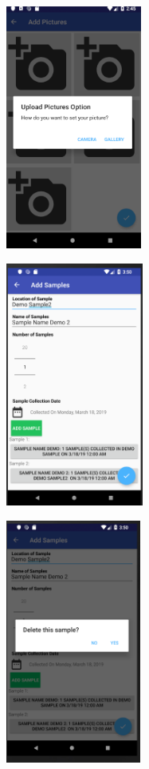 \documentclass[onecolumn, draftclsnofoot,10pt, compsoc]{IEEEtran}
\begin{document}
\begin{center}
\includegraphics[height=8cm]{add_pictures_choice.png}
\end{center}

\begin{center}
\includegraphics[height=8cm]{Beta_Add_samples.png}
\end{center}

\begin{center}
\includegraphics[height=8cm]{Beta_Add_samples_2.png}
\end{center}
\end{document}
